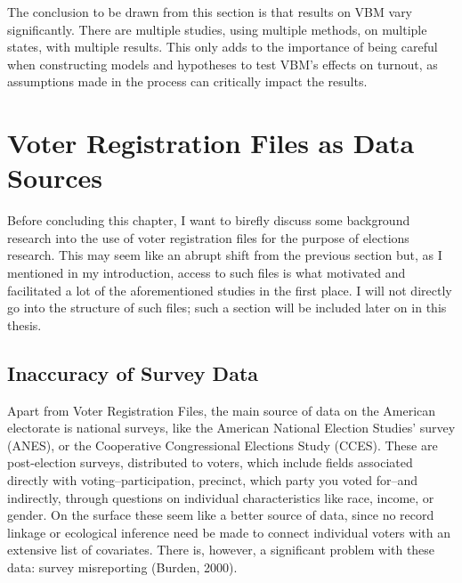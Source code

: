\documentclass[12pt,twoside]{reedthesis}
\begin{document}
  The conclusion to be drawn from this section is that results on VBM vary
  significantly. There are multiple studies, using multiple methods, on
  multiple states, with multiple results. This only adds to the importance
  of being careful when constructing models and hypotheses to test VBM's
  effects on turnout, as assumptions made in the process can critically
  impact the results.
  
  \section{Voter Registration Files as Data
  Sources}\label{voter-registration-files-as-data-sources}
  
  Before concluding this chapter, I want to birefly discuss some
  background research into the use of voter registration files for the
  purpose of elections research. This may seem like an abrupt shift from
  the previous section but, as I mentioned in my introduction, access to
  such files is what motivated and facilitated a lot of the aforementioned
  studies in the first place. I will not directly go into the structure of
  such files; such a section will be included later on in this thesis.
  
  \subsection{Inaccuracy of Survey Data}\label{inaccuracy-of-survey-data}
  
  Apart from Voter Registration Files, the main source of data on the
  American electorate is national surveys, like the American National
  Election Studies' survey (ANES), or the Cooperative Congressional
  Elections Study (CCES). These are post-election surveys, distributed to
  voters, which include fields associated directly with
  voting--participation, precinct, which party you voted for--and
  indirectly, through questions on individual characteristics like race,
  income, or gender. On the surface these seem like a better source of
  data, since no record linkage or ecological inference need be made to
  connect individual voters with an extensive list of covariates. There
  is, however, a significant problem with these data: survey misreporting
  (Burden, 2000).
  
\end{document}

